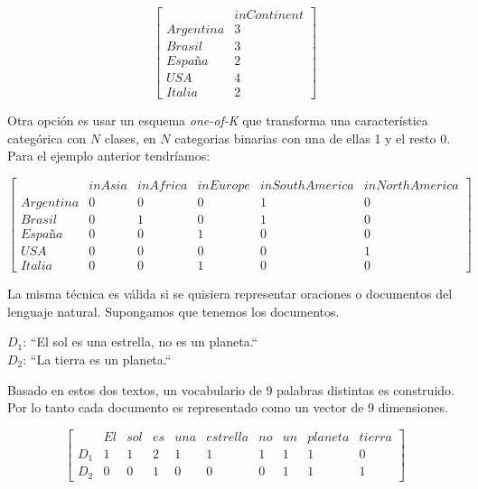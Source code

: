 \begin{equation*}
    \begin{bmatrix}
         & inContinent\\
        Argentina & 3 \\
        Brasil & 3 \\
        España & 2 \\
        USA & 4  \\
        Italia & 2 
    \end{bmatrix}
\end{equation*}

Otra opción es usar un esquema \emph{one-of-K} que
transforma una característica categórica con $N$ clases, en $N$ categorias
binarias con una de ellas 1 y el resto 0. Para el ejemplo anterior tendríamos:

\begin{equation*}
\begin{bmatrix}
    & inAsia & inAfrica & inEurope & inSouthAmerica & inNorthAmerica \\
    Argentina & 0 & 0 & 0 & 1 & 0 \\
    Brasil & 0 & 1 & 0 & 1 & 0 \\
    España & 0 & 0 & 1 & 0 & 0 \\
    USA & 0 & 0 & 0 & 0 & 1 \\
    Italia & 0 & 0 & 1 & 0 & 0
\end{bmatrix}
\end{equation*}

La misma técnica es válida si se quisiera representar oraciones o documentos del
lenguaje natural. Supongamos que tenemos los documentos.

\begin{center}
    $D_1$: ``El sol es una estrella, no es un planeta.`` \\
    $D_2$: ``La tierra es un planeta.``    
\end{center}

Basado en  estos dos textos, un vocabulario de 9 palabras distintas es
construido. Por lo tanto cada documento es representado como un vector de 9
dimensiones.

\begin{equation*}
    \begin{bmatrix}
        & El & sol & es & una & estrella & no & un & planeta & tierra \\
        D_1 & 1 & 1 & 2 & 1 & 1 & 1 & 1 & 1 & 0  \\
        D_2 & 0 & 0 & 1 & 0 & 0 & 0 & 1 & 1 & 1 
    \end{bmatrix}
\end{equation*}

